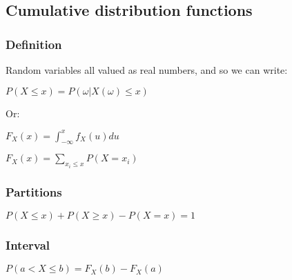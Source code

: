 
\subsection{Cumulative distribution functions}

\subsubsection{Definition}

Random variables all valued as real numbers, and so we can write:

$P(X\le x)=P({\omega |X(\omega)\le x})$

Or:

$F_X(x)=\int_{-\infty}^x f_X(u)du$

$F_X(x)=\sum_{x_i\le x}P(X=x_i) $

\subsubsection{Partitions}

$P(X\le x)+P(X\ge x)-P(X=x)=1$

\subsubsection{Interval}

$P(a< X\le b)=F_X(b)-F_X(a)$

